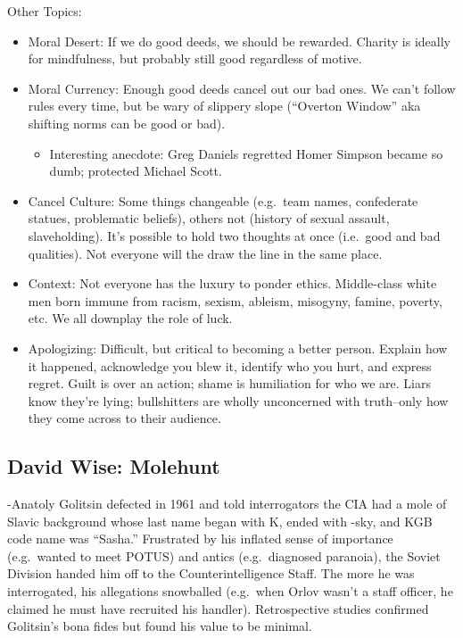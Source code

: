 \documentclass[
]{article}
\providecommand{\tightlist}{%
  \setlength{\itemsep}{0pt}\setlength{\parskip}{0pt}}
\begin{document}
Other Topics:

\begin{itemize}
\item
  Moral Desert: If we do good deeds, we should be rewarded. Charity is
  ideally for mindfulness, but probably still good regardless of motive.
\item
  Moral Currency: Enough good deeds cancel out our bad ones. We can't
  follow rules every time, but be wary of slippery slope (``Overton
  Window'' aka shifting norms can be good or bad).

  \begin{itemize}
  \tightlist
  \item
    Interesting anecdote: Greg Daniels regretted Homer Simpson became so
    dumb; protected Michael Scott.
  \end{itemize}
\item
  Cancel Culture: Some things changeable (e.g.~team names, confederate
  statues, problematic beliefs), others not (history of sexual assault,
  slaveholding). It's possible to hold two thoughts at once (i.e.~good
  and bad qualities). Not everyone will the draw the line in the same
  place.
\item
  Context: Not everyone has the luxury to ponder ethics. Middle-class
  white men born immune from racism, sexism, ableism, misogyny, famine,
  poverty, etc. We all downplay the role of luck.
\item
  Apologizing: Difficult, but critical to becoming a better person.
  Explain how it happened, acknowledge you blew it, identify who you
  hurt, and express regret. Guilt is over an action; shame is
  humiliation for who we are. Liars know they're lying; bullshitters are
  wholly unconcerned with truth--only how they come across to their
  audience.
\end{itemize}

\hypertarget{david-wise-molehunt}{%
\subsection{David Wise: Molehunt}\label{david-wise-molehunt}}

-Anatoly Golitsin defected in 1961 and told interrogators the CIA had a
mole of Slavic background whose last name began with K, ended with -sky,
and KGB code name was ``Sasha.'' Frustrated by his inflated sense of
importance (e.g.~wanted to meet POTUS) and antics (e.g.~diagnosed
paranoia), the Soviet Division handed him off to the Counterintelligence
Staff. The more he was interrogated, his allegations snowballed
(e.g.~when Orlov wasn't a staff officer, he claimed he must have
recruited his handler). Retrospective studies confirmed Golitsin's bona
fides but found his value to be minimal.
\end{document}
